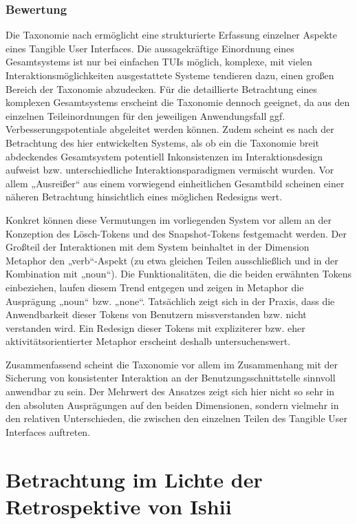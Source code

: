 \subsubsection{Bewertung}

Die Taxonomie nach \citeauthor{Fishkin04} ermöglicht eine strukturierte Erfassung einzelner Aspekte eines Tangible User Interfaces. Die aussagekräftige Einordnung eines Gesamtsystems  ist nur bei einfachen \glspl{TUI} möglich, komplexe, mit vielen Interaktionsmöglichkeiten ausgestattete Systeme tendieren dazu, einen großen Bereich der Taxonomie abzudecken. Für die detaillierte Betrachtung eines komplexen Gesamtsystems erscheint die Taxonomie dennoch geeignet, da aus den einzelnen Teileinordnungen für den jeweiligen Anwendungsfall ggf. Verbesserungspotentiale abgeleitet werden können. Zudem scheint es nach der Betrachtung des hier entwickelten Systems, als ob ein die Taxonomie breit abdeckendes Gesamtsystem potentiell Inkonsistenzen im Interaktionsdesign aufweist bzw. unterschiedliche Interaktionsparadigmen vermischt wurden. Vor allem „Ausreißer“ aus einem vorwiegend einheitlichen Gesamtbild scheinen einer näheren Betrachtung hinsichtlich eines möglichen Redesigns wert.

Konkret können diese Vermutungen im vorliegenden System vor allem an der Konzeption des Lösch-Tokens und des Snapshot-Tokens festgemacht werden. Der Großteil der Interaktionen mit dem System beinhaltet in der Dimension Metaphor den „verb“-Aspekt (zu etwa gleichen Teilen ausschließlich und in der Kombination mit „noun“). Die Funktionalitäten, die die beiden erwähnten Tokens einbeziehen, laufen diesem Trend entgegen und zeigen in Metaphor die Ausprägung „noun“ bzw. „none“. Tatsächlich zeigt sich in der Praxis, dass die Anwendbarkeit dieser Tokens von Benutzern missverstanden bzw. nicht verstanden wird. Ein Redesign dieser Tokens mit expliziterer bzw. eher aktivitätsorientierter Metaphor erscheint deshalb untersuchenswert.

Zusammenfassend scheint die Taxonomie vor allem im Zusammenhang mit der Sicherung von konsistenter Interaktion an der Benutzungsschnittstelle sinnvoll anwendbar zu sein. Der Mehrwert des Ansatzes zeigt sich hier nicht so sehr in den absoluten Ausprägungen auf den beiden Dimensionen, sondern vielmehr in den relativen Unterschieden, die zwischen den einzelnen Teilen des Tangible User Interfaces auftreten.


\section{Betrachtung im Lichte der Retrospektive von Ishii} %
\label{sec:betrachtung_im_lichte_der_retrospektive_von_ishii}


